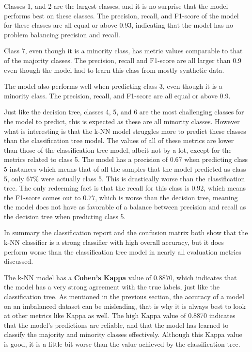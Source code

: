 \documentclass[conference]{IEEEtran}
\begin{document}
Classes 1, and 2 are the largest classes, and it is no surprise that the model performs best on these classes. The precision, recall, and F1-score of the model for these classes are all equal or above 0.93, indicating that the model has no problem balancing precision and recall.

Class 7, even though it is a minority class, has metric values comparable to that of the majority classes. The precision, recall and F1-score are all larger than 0.9 even though the model had to learn this class from mostly synthetic data.

The model also performs well when predicting class 3, even though it is a minority class. The precision, recall, and F1-score are all equal or above 0.9.

Just like the decision tree, classes 4, 5, and 6 are the most challenging classes for the model to predict, this is expected as these are all minority classes. However what is interesting is that the k-NN model struggles more to predict these classes than the classification tree model. The values of all of these metrics are lower than those of the classification tree model, albeit not by a lot, except for the metrics related to class 5. The model has a precision of 0.67 when predicting class 5 instances which means that of all the samples that the model predicted as class 5, only 67\% were actually class 5. This is drastically worse than the classification tree. The only redeeming fact is that the recall for this class is 0.92, which means the F1-score comes out to 0.77, which is worse than the decision tree, meaning the model does not have as favorable of a balance between precision and recall as the decision tree when predicting class 5.

In summary the classification report and the confusion matrix both show that the k-NN classifier is a strong classifier with high overall accuracy, but it does perform worse than the classification tree model in nearly all evaluation metrics discussed.

The k-NN model has a \textbf{Cohen's Kappa} value of 0.8870, which indicates that the model has a very strong agreement with the true labels, just like the classification tree. As mentioned in the previous section, the accuracy of a model on an imbalanced dataset can be misleading, that is why it is always best to look at other metrics like Kappa as well. The high Kappa value of 0.8870 indicates that the model's predictions are reliable, and that the model has learned to classify the majority and minority classes effectively. Although this Kappa value is good, it is a little bit worse than the value achieved by the classification tree.
\end{document}
